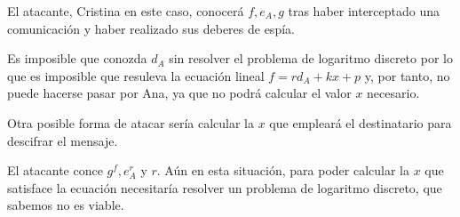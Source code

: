 \begin{problem}[3]
El atacante, Cristina en este caso, conocerá $f,e_A,g$ tras haber interceptado una comunicación y haber realizado sus deberes de espía.

Es imposible que conozda $d_A$ sin resolver el problema de logaritmo discreto por lo que es imposible que resuleva la ecuación lineal $f = rd_A+kx + p$ y, por tanto, no puede hacerse pasar por Ana, ya que no podrá calcular el valor $x$ necesario.

Otra posible forma de atacar sería calcular la $x$ que empleará el destinatario para descifrar el mensaje.

El atacante conce $g^f,e_A^r$ y $r$. Aún en esta situación, para poder calcular la $x$ que satisface la ecuación necesitaría resolver un problema de logaritmo discreto, que sabemos no es viable.
\end{problem}


